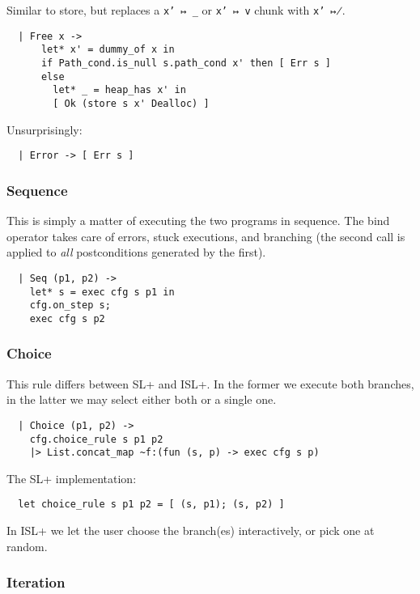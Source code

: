 \documentclass[parskip=half]{scrartcl}
\begin{document}

Similar to store, but replaces a \texttt{x' ↦ \_} or \texttt{x' ↦ v} chunk with \texttt{x' ↦̸}.

\begin{verbatim}
  | Free x ->
      let* x' = dummy_of x in
      if Path_cond.is_null s.path_cond x' then [ Err s ]
      else
        let* _ = heap_has x' in
        [ Ok (store s x' Dealloc) ]
\end{verbatim}


Unsurprisingly:

\begin{verbatim}
  | Error -> [ Err s ]
\end{verbatim}

\subsubsection{Sequence}

This is simply a matter of executing the two programs in sequence. The bind operator takes care of errors, stuck executions, and branching (the second  call is applied to \emph{all} postconditions generated by the first).

\begin{verbatim}
  | Seq (p1, p2) ->
    let* s = exec cfg s p1 in
    cfg.on_step s;
    exec cfg s p2
\end{verbatim}

\subsubsection{Choice}

This rule differs between SL+ and ISL+. In the former we execute both branches, in the latter we may select either both or a single one.

\begin{verbatim}
  | Choice (p1, p2) ->
    cfg.choice_rule s p1 p2
    |> List.concat_map ~f:(fun (s, p) -> exec cfg s p)
\end{verbatim}

The SL+ implementation:
\begin{verbatim}
  let choice_rule s p1 p2 = [ (s, p1); (s, p2) ]
\end{verbatim}

In ISL+ we let the user choose the branch(es) interactively, or pick one at random.

\subsubsection{Iteration}
\end{document}
